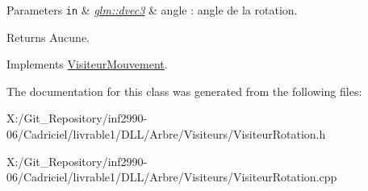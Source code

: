 \begin{DoxyParams}[1]{Parameters}
\mbox{\tt in}  & {\em \hyperlink{group__core__types_ga7f3287f952e6ccb481231368091702ac}{glm\-::dvec3}} & angle \-: angle de la rotation.\\
\hline
\end{DoxyParams}
\begin{DoxyReturn}{Returns}
Aucune. 
\end{DoxyReturn}


Implements \hyperlink{class_visiteur_mouvement}{Visiteur\-Mouvement}.



The documentation for this class was generated from the following files\-:\begin{DoxyCompactItemize}
\item 
X\-:/\-Git\-\_\-\-Repository/inf2990-\/06/\-Cadriciel/livrable1/\-D\-L\-L/\-Arbre/\-Visiteurs/Visiteur\-Rotation.\-h\item 
X\-:/\-Git\-\_\-\-Repository/inf2990-\/06/\-Cadriciel/livrable1/\-D\-L\-L/\-Arbre/\-Visiteurs/Visiteur\-Rotation.\-cpp\end{DoxyCompactItemize}
